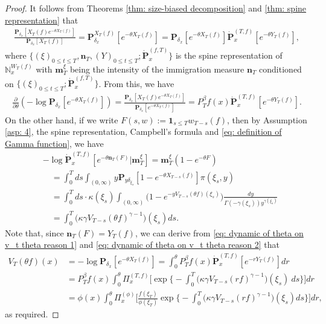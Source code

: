 \documentclass[12pt,a4paper]{amsart}
\theoremstyle{definition}
\numberwithin{equation}{section}
\begin{document}
\begin{proof}
	It follows from Theorems
	\ref{thm: size-biased decomposition} and \ref{thm: spine representation} that
  \begin{align}
    \frac{ \mathbf P_{\delta_x}[X_T(f)e^{-\theta X_T(f)}] } {  \mathbf P_{\delta_x} [X_T(f)] }
    = \mathbf P_{\delta_x}^{X_T(f)} [e^{-\theta X_T(f)}]
    = \mathbf P_{\delta_x} [e^{-\theta X_T(f)}] \dot {\mathbf P}_x^{(T,f)}[e^{-\theta Y_T(f)}],
\end{align}
where $\{(\xi)_{0\le t\le T}, \mathbf n_T, (Y)_{0\le t\le T}; \dot {\mathbf P}^{(f,T)}_x\}$ is the spine representation of $\mathbb N^{W_T(f)}_x$ with $\mathbf m^\xi_T$ being the intensity of the immigration measure $\mathbf n_T$ conditioned on $\{(\xi)_{0\le t\le T}; \dot {\mathbf P}^{(f,T)}_x\}$.
From this, we have
\begin{align} \label{eq: dynamic of theta on v_t theta reason 1}
	\frac{\partial}{\partial \theta}
	(-\log \mathbf P_{\delta_x}[e^{-\theta X_T(f)}])
	= \frac{\mathbf P_{\delta_x}[X_T(f)e^{-\theta X_T(f)}]}{\mathbf P_{\delta_x}[e^{-\theta X_T(f)}]}
	= P^\beta_T f(x) \dot {\mathbf P}_x^{(T,f)}[e^{-\theta Y_T(f)}].
\end{align}
On the other hand, if we write $F(s,w):= \mathbf 1_{s\leq T} w_{T-s}(f)$, then by Assumption \ref{asp: 4}, the spine representation, Campbell's formula and \eqref{eq: definition of Gamma function}, we have
\begin{align}\label{eq: dynamic of theta on v_t theta reason 2}
	&-\log \dot {\mathbf P}^{(T,f)}_{x}[e^{-\theta \mathbf n_T(F)}|\mathbf m_T^\xi]
   = \mathbf m_T^\xi(1-e^{-\theta F})
	\\ & \quad = \int_0^T ds \int_{(0,\infty)} y \mathbf P_{y\delta_{\xi_s}}[1- e^{-\theta X_{T-s}(f)}] \pi(\xi_s,y)
	\\ & \quad = \int_0^T ds \cdot \kappa(\xi_s) \int_{(0,\infty)} \mathbf (1- e^{- y V_{T-s}(\theta f)(\xi_s)}) \frac{dy}{\Gamma(-\gamma(\xi_s)) y^{\gamma(\xi_s)}}
	\\ & \quad = \int_0^T \big(\kappa\gamma V_{T-s}(\theta f)^{\gamma-1}\big)(\xi_s) ds.
\end{align}
Note that, since $\mathbf n_T(F)= Y_T(f)$, we can derive from \eqref{eq: dynamic of theta on v_t theta reason 1} and \eqref{eq: dynamic of theta on v_t theta reason 2} that
\begin{align}
	V_T(\theta f)(x)
	&= -\log \mathbf P_{\delta_x}[e^{-\theta X_T(f)}]
   = \int_0^\theta P^\beta_Tf(x)
   \dot {\mathbf P}_x^{(T,f)}[e^{-r  Y_T(f)}] dr
	\\ &=P^\beta_Tf(x)\int_0^\theta \Pi_x^{(T,f)} \Big[\exp\Big\{-\int_0^T \big(\kappa\gamma V_{T-s}(r f)^{\gamma-1}\big)(\xi_s)~ds\Big\}\Big] dr
	\\ &= \phi( x) \int_0^\theta \Pi_x^{(\phi)} \Big[ \frac{ f(\xi_T) } { \phi(\xi_T) } \exp\Big\{ - \int_0^T \big( \kappa \gamma V_{T-s} (r f)^{ \gamma - 1} \big) ( \xi_s) ds\Big\} \Big] dr,
\end{align}
as required.
\end{proof}
\end{document}
